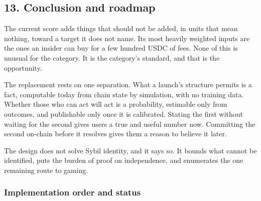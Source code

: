 \subsection{13. Conclusion and roadmap}\label{conclusion-and-roadmap}

The current score adds things that should not be added, in units that mean nothing, toward a target it does not name. Its most heavily weighted inputs are the ones an insider can buy for a few hundred USDC of fees. None of this is unusual for the category. It is the category's standard, and that is the opportunity.

The replacement rests on one separation. What a launch's structure permits is a fact, computable today from chain state by simulation, with no training data. Whether those who can act will act is a probability, estimable only from outcomes, and publishable only once it is calibrated. Stating the first without waiting for the second gives users a true and useful number now. Committing the second on-chain before it resolves gives them a reason to believe it later.

The design does not solve Sybil identity, and it says so. It bounds what cannot be identified, puts the burden of proof on independence, and enumerates the one remaining route to gaming.

\subsubsection{Implementation order and status}\label{implementation-order-and-status}

